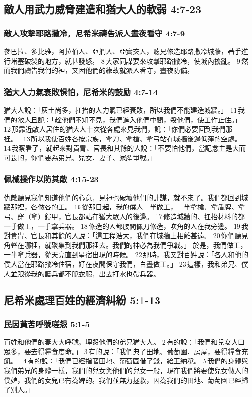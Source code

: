 \subsection{敵人用武力威脅建造和猶大人的軟弱 4:7-23}
\subsubsection{敵人攻擊耶路撒冷，尼希米禱告派人晝夜看守 4:7-9}
參巴拉、多比雅，阿拉伯人、亞捫人、亞實突人，聽見修造耶路撒冷城牆，著手進行堵塞破裂的地方，就甚發怒。 8 大家同謀要來攻擊耶路撒冷，使城內擾亂。 9 然而我們禱告我們的神，又因他們的緣故就派人看守，晝夜防備。


\subsubsection{猶大人力氣衰敗惧怕，尼希米的鼓励 4:7-14}
猶大人說：「灰土尚多，扛抬的人力氣已經衰敗，所以我們不能建造城牆。」 11 我們的敵人且說：「趁他們不知不見，我們進入他們中間，殺他們，使工作止住。」12 那靠近敵人居住的猶大人十次從各處來見我們，說：「你們必要回到我們那裡。」 13 所以我使百姓各按宗族，拿刀、拿槍、拿弓站在城牆後邊低窪的空處。 14 我察看了，就起來對貴胄、官長和其餘的人說：「不要怕他們，當記念主是大而可畏的，你們要為弟兄、兒女、妻子、家產爭戰。」 

\subsubsection{佩械操作以防其敵 4:15-23}
仇敵聽見我們知道他們的心意，見神也破壞他們的計謀，就不來了。我們都回到城牆那裡，各做各的工。 16 從那日起，我的僕人一半做工，一半拿槍、拿盾牌、拿弓、穿（拿）鎧甲，官長都站在猶大眾人的後邊。 17 修造城牆的、扛抬材料的都一手做工，一手拿兵器。 18 修造的人都腰間佩刀修造，吹角的人在我旁邊。 19 我對貴胄、官長和其餘的人說：「這工程浩大，我們在城牆上相離甚遠。 20 你們聽見角聲在哪裡，就聚集到我們那裡去。我們的神必為我們爭戰。」
於是，我們做工，一半拿兵器，從天亮直到星宿出現的時候。 22 那時，我又對百姓說：「各人和他的僕人當在耶路撒冷住宿，好在夜間保守我們，白晝做工。」 23 這樣，我和弟兄、僕人並跟從我的護兵都不脫衣服，出去打水也帶兵器。


\subsection{尼希米處理百姓的經濟糾紛 5:1-13}
\subsubsection{民因貧苦呼號嗟怨 5:1-5}
百姓和他們的妻大大呼號，埋怨他們的弟兄猶大人。 2 有的說：「我們和兒女人口眾多，要去得糧食度命。」 3 有的說：「我們典了田地、葡萄園、房屋，要得糧食充飢。」 4 有的說：「我們已經指著田地、葡萄園借了錢，給王納稅。 5 我們的身體與我們弟兄的身體一樣，我們的兒女與他們的兒女一般，現在我們將要使兒女做人的僕婢，我們的女兒已有為婢的。我們並無力拯救，因為我們的田地、葡萄園已經歸了別人。」

